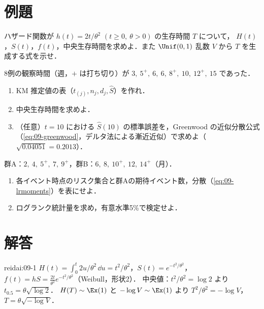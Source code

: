 \section{例題}\label{sec:09-ex}
\begin{reidai}[関数の関係]\label{reidai:09-1}
ハザード関数が $h(t)=2t/\theta^2$ $(t\ge0,\ \theta>0)$ の生存時間 $T$ について，
$H(t)$，$S(t)$，$f(t)$，中央生存時間を求めよ．また $\Unif(0,1)$ 乱数 $V$ から $T$ を生成する式を示せ．
\end{reidai}

\begin{reidai}[KM 推定と中央生存時間]\label{reidai:09-2}
8例の観察時間（週，$+$ は打ち切り）が $3,\ 5^+,\ 6,\ 6,\ 8^+,\ 10,\ 12^+,\ 15$ であった．
\begin{enumerate}[label=(\arabic*)]
\item KM 推定値の表（$t_{(j)},n_j,d_j,\hat S$）を作れ．
\item 中央生存時間を求めよ．
\item （任意）$t=10$ における $\hat S(10)$ の標準誤差を，Greenwood の近似分散公式（\cref{eq:09-greenwood}，デルタ法による漸近近似）で求めよ（$\sqrt{0.04051}=0.2013$）．
\end{enumerate}
\end{reidai}

\begin{reidai}[ログランク検定の手計算]\label{reidai:09-3}
群A：$2,\ 4,\ 5^+,\ 7,\ 9^+$，群B：$6,\ 8,\ 10^+,\ 12,\ 14^+$（月）．
\begin{enumerate}[label=(\arabic*)]
\item 各イベント時点のリスク集合と群Aの期待イベント数，分散（\cref{eq:09-lrmoments}）を表にせよ．
\item ログランク統計量を求め，有意水準5\%で検定せよ．
\end{enumerate}
\end{reidai}

\section{解答}\label{sec:09-sol}
\begin{kaitou}{reidai:09-1}
$H(t)=\int_0^t2u/\theta^2\,\dd u=t^2/\theta^2$，$S(t)=e^{-t^2/\theta^2}$，$f(t)=hS=\frac{2t}{\theta^2}e^{-t^2/\theta^2}$（Weibull，形状2）．
中央値：$t^2/\theta^2=\log2$ より $t_{0.5}=\theta\sqrt{\log2}$．
$H(T)\sim\Ex(1)$ と $-\log V\sim\Ex(1)$ より $T^2/\theta^2=-\log V$，$T=\theta\sqrt{-\log V}$．
\end{kaitou}

